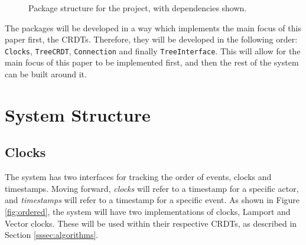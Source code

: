 \documentclass[12pt]{report}
\begin{document}
\begin{figure}[H] 
    \centering
    \caption{Package structure for the project, with dependencies shown.}
    \label{fig:packages}
\end{figure}

The packages will be developed in a way which implements the main focus of this paper first, the CRDTs. Therefore, they will be developed in the following order: \texttt{Clocks}, \texttt{TreeCRDT}, \texttt{Connection} and finally \texttt{TreeInterface}. This will allow for the main focus of this paper to be implemented first, and then the rest of the system can be built around it. \par

\section{System Structure}

\subsection{Clocks}
The system has two interfaces for tracking the order of events, clocks and timestamps. Moving forward, \textit{clocks} will refer to a timestamp for a specific actor, and \textit{timestamps} will refer to a timestamp for a specific event.  
As shown in Figure \ref{fig:ordered}, the system will have two implementations of clocks, Lamport and Vector clocks. These will be used within their respective CRDTs, as described in Section \ref{sssec:algorithms}. \par
\end{document}
